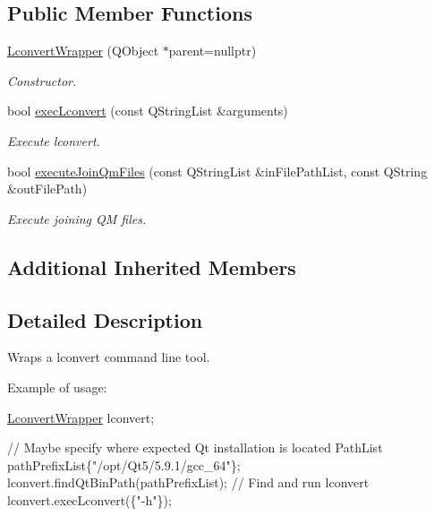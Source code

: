 \subsection*{Public Member Functions}
\begin{DoxyCompactItemize}
\item 
\hyperlink{class_mdt_1_1_deploy_utils_1_1_lconvert_wrapper_a7480fdd01a013b4661f40b980d1340af}{Lconvert\+Wrapper} (Q\+Object $\ast$parent=nullptr)\hypertarget{class_mdt_1_1_deploy_utils_1_1_lconvert_wrapper_a7480fdd01a013b4661f40b980d1340af}{}\label{class_mdt_1_1_deploy_utils_1_1_lconvert_wrapper_a7480fdd01a013b4661f40b980d1340af}

\begin{DoxyCompactList}\small\item\em Constructor. \end{DoxyCompactList}\item 
bool \hyperlink{class_mdt_1_1_deploy_utils_1_1_lconvert_wrapper_a8616e05f113ea741e96baf2388fe0ffd}{exec\+Lconvert} (const Q\+String\+List \&arguments)\hypertarget{class_mdt_1_1_deploy_utils_1_1_lconvert_wrapper_a8616e05f113ea741e96baf2388fe0ffd}{}\label{class_mdt_1_1_deploy_utils_1_1_lconvert_wrapper_a8616e05f113ea741e96baf2388fe0ffd}

\begin{DoxyCompactList}\small\item\em Execute lconvert. \end{DoxyCompactList}\item 
bool \hyperlink{class_mdt_1_1_deploy_utils_1_1_lconvert_wrapper_a367b7bd6264b9c2e62b1c1359938f9fc}{execute\+Join\+Qm\+Files} (const Q\+String\+List \&in\+File\+Path\+List, const Q\+String \&out\+File\+Path)
\begin{DoxyCompactList}\small\item\em Execute joining QM files. \end{DoxyCompactList}\end{DoxyCompactItemize}
\subsection*{Additional Inherited Members}


\subsection{Detailed Description}
Wraps a lconvert command line tool. 

Example of usage\+: 
\begin{DoxyCode}
\hyperlink{class_mdt_1_1_deploy_utils_1_1_lconvert_wrapper_a7480fdd01a013b4661f40b980d1340af}{LconvertWrapper} lconvert;

\textcolor{comment}{// Maybe specify where expected Qt installation is located}
PathList pathPrefixList\{\textcolor{stringliteral}{"/opt/Qt5/5.9.1/gcc\_64"}\};
lconvert.findQtBinPath(pathPrefixList);
\textcolor{comment}{// Find and run lconvert}
lconvert.execLconvert(\{\textcolor{stringliteral}{"-h"}\});
\end{DoxyCode}
 

